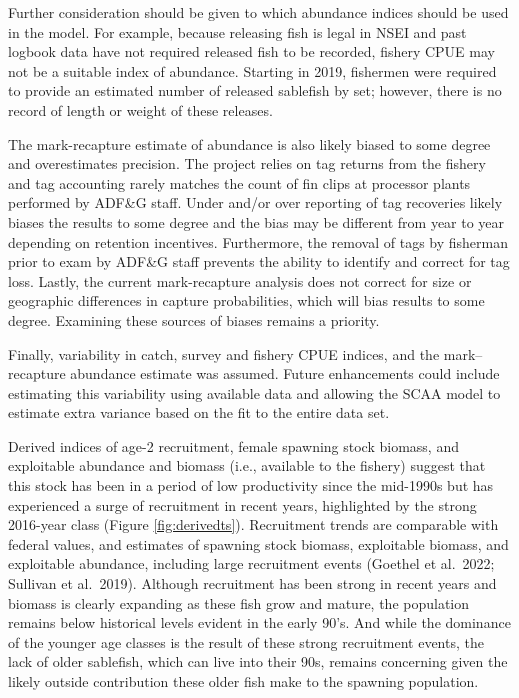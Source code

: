 \documentclass[
]{article}
\begin{document}
Further consideration should be given to which abundance indices should be used in the model. For example, because releasing fish is legal in NSEI and past logbook data have not required released fish to be recorded, fishery CPUE may not be a suitable index of abundance. Starting in 2019, fishermen were required to provide an estimated number of released sablefish by set; however, there is no record of length or weight of these releases.

The mark-recapture estimate of abundance is also likely biased to some degree and overestimates precision. The project relies on tag returns from the fishery and tag accounting rarely matches the count of fin clips at processor plants performed by ADF\&G staff. Under and/or over reporting of tag recoveries likely biases the results to some degree and the bias may be different from year to year depending on retention incentives. Furthermore, the removal of tags by fisherman prior to exam by ADF\&G staff prevents the ability to identify and correct for tag loss. Lastly, the current mark-recapture analysis does not correct for size or geographic differences in capture probabilities, which will bias results to some degree. Examining these sources of biases remains a priority.

Finally, variability in catch, survey and fishery CPUE indices, and the mark--recapture abundance estimate was assumed. Future enhancements could include estimating this variability using available data and allowing the SCAA model to estimate extra variance based on the fit to the entire data set.

Derived indices of age-2 recruitment, female spawning stock biomass, and exploitable abundance and biomass (i.e., available to the fishery) suggest that this stock has been in a period of low productivity since the mid-1990s but has experienced a surge of recruitment in recent years, highlighted by the strong 2016-year class (Figure \ref{fig:derivedts}). Recruitment trends are comparable with federal values, and estimates of spawning stock biomass, exploitable biomass, and exploitable abundance, including large recruitment events (Goethel et al.~2022; Sullivan et al.~2019). Although recruitment has been strong in recent years and biomass is clearly expanding as these fish grow and mature, the population remains below historical levels evident in the early 90's. And while the dominance of the younger age classes is the result of these strong recruitment events, the lack of older sablefish, which can live into their 90s, remains concerning given the likely outside contribution these older fish make to the spawning population.
\end{document}
